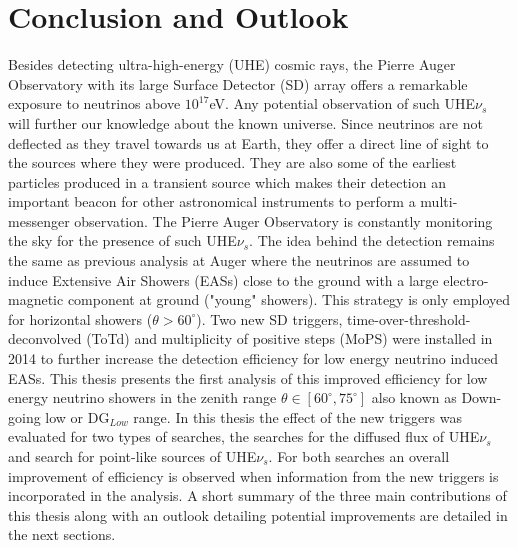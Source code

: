 
\chapter{Conclusion and Outlook}
\label{chap:conc}

Besides detecting ultra-high-energy (UHE) cosmic rays, the Pierre Auger Observatory with its large Surface Detector (SD) array offers a remarkable exposure to neutrinos above $10^{17}$eV. Any potential observation of such UHE$\nu_s$ will further our knowledge about the known universe. Since neutrinos are not deflected as they travel towards us at Earth, they offer a direct line of sight to the sources where they were produced. They are also some of the earliest particles produced in a transient source which makes their detection an important beacon for other astronomical instruments to perform a multi-messenger observation. The Pierre Auger Observatory is constantly monitoring the sky for the presence of such UHE$\nu_s$. The idea behind the detection remains the same as previous analysis at Auger where the neutrinos are assumed to induce Extensive Air Showers (EASs) close to the ground with a large electro-magnetic component at ground ("young" showers). This strategy is only employed for horizontal showers ($\theta > 60^{\circ}$). Two new SD triggers, time-over-threshold-deconvolved (ToTd) and multiplicity of positive steps (MoPS) were installed in 2014 to further increase the detection efficiency for low energy neutrino induced EASs. This thesis presents the first analysis of this improved efficiency for low energy neutrino showers in the zenith range $\theta \in [60^{\circ},75^\circ]$ also known as Down-going low or DG$_{Low}$ range. In this thesis the effect of the new triggers was evaluated for two types of searches, the searches for the diffused flux of UHE$\nu_s$ and search for point-like sources of UHE$\nu_s$. For both searches an overall improvement of efficiency is observed when information from the new triggers is incorporated in the analysis. A short summary of the three main contributions of this thesis along with an outlook detailing potential improvements are detailed in the next sections. 
